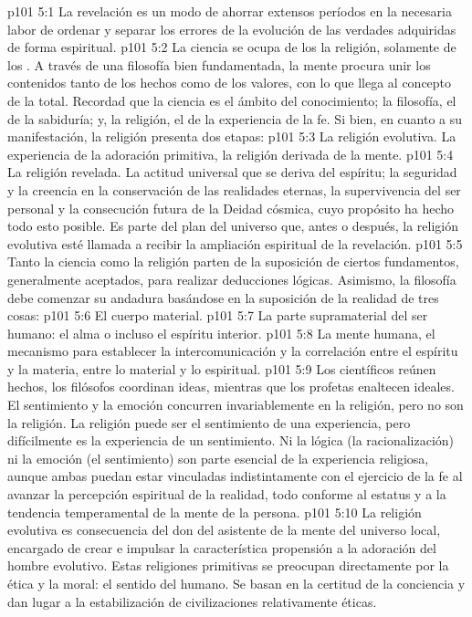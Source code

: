 \vs p101 5:1 La revelación es un modo de ahorrar extensos períodos en la necesaria labor de ordenar y separar los errores de la evolución de las verdades adquiridas de forma espiritual.
\vs p101 5:2 La ciencia se ocupa de los  la religión, solamente de los . A través de una filosofía bien fundamentada, la mente procura unir los contenidos tanto de los hechos como de los valores, con lo que llega al concepto de la  total. Recordad que la ciencia es el ámbito del conocimiento; la filosofía, el de la sabiduría; y, la religión, el de la experiencia de la fe. Si bien, en cuanto a su manifestación, la religión presenta dos etapas:
\vs p101 5:3 La religión evolutiva. La experiencia de la adoración primitiva, la religión derivada de la mente.
\vs p101 5:4 La religión revelada. La actitud universal que se deriva del espíritu; la seguridad y la creencia en la conservación de las realidades eternas, la supervivencia del ser personal y la consecución futura de la Deidad cósmica, cuyo propósito ha hecho todo esto posible. Es parte del plan del universo que, antes o después, la religión evolutiva esté llamada a recibir la ampliación espiritual de la revelación.
\vs p101 5:5 \pc Tanto la ciencia como la religión parten de la suposición de ciertos fundamentos, generalmente aceptados, para realizar deducciones lógicas. Asimismo, la filosofía debe comenzar su andadura basándose en la suposición de la realidad de tres cosas:
\vs p101 5:6 El cuerpo material.
\vs p101 5:7 La parte supramaterial del ser humano: el alma o incluso el espíritu interior.
\vs p101 5:8 La mente humana, el mecanismo para establecer la intercomunicación y la correlación entre el espíritu y la materia, entre lo material y lo espiritual.
\vs p101 5:9 \pc Los científicos reúnen hechos, los filósofos coordinan ideas, mientras que los profetas enaltecen ideales. El sentimiento y la emoción concurren invariablemente en la religión, pero no son la religión. La religión puede ser el sentimiento de una experiencia, pero difícilmente es la experiencia de un sentimiento. Ni la lógica (la racionalización) ni la emoción (el sentimiento) son parte esencial de la experiencia religiosa, aunque ambas puedan estar vinculadas indistintamente con el ejercicio de la fe al avanzar la percepción espiritual de la realidad, todo conforme al estatus y a la tendencia temperamental de la mente de la persona.
\vs p101 5:10 La religión evolutiva es consecuencia del don del asistente de la mente del universo local, encargado de crear e impulsar la característica propensión a la adoración del hombre evolutivo. Estas religiones primitivas se preocupan directamente por la ética y la moral: el sentido del  humano. Se basan en la certitud de la conciencia y dan lugar a la estabilización de civilizaciones relativamente éticas.
